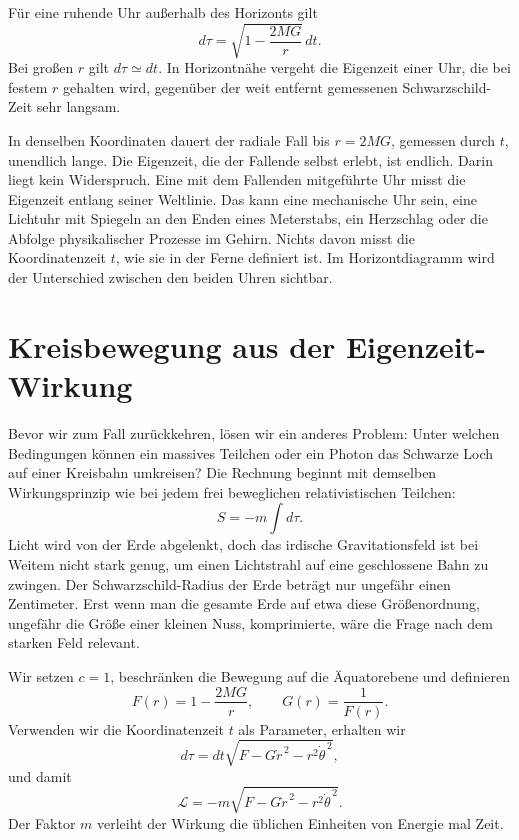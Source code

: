 Für eine ruhende Uhr außerhalb des Horizonts gilt
\begin{equation}
d\tau
=
\sqrt{1-\frac{2MG}{r}}\,dt.
\label{eq:l6-static-clock}
\end{equation}
Bei großen \(r\) gilt \(d\tau\simeq dt\). In Horizontnähe vergeht die Eigenzeit einer Uhr, die bei festem \(r\) gehalten wird, gegenüber der weit entfernt gemessenen Schwarzschild-Zeit sehr langsam.

In denselben Koordinaten dauert der radiale Fall bis \(r=2MG\), gemessen durch \(t\), unendlich lange. Die Eigenzeit, die der Fallende selbst erlebt, ist endlich. Darin liegt kein Widerspruch. Eine mit dem Fallenden mitgeführte Uhr misst die Eigenzeit entlang seiner Weltlinie. Das kann eine mechanische Uhr sein, eine Lichtuhr mit Spiegeln an den Enden eines Meterstabs, ein Herzschlag oder die Abfolge physikalischer Prozesse im Gehirn. Nichts davon misst die Koordinatenzeit \(t\), wie sie in der Ferne definiert ist. Im Horizontdiagramm wird der Unterschied zwischen den beiden Uhren sichtbar.

\section{Kreisbewegung aus der Eigenzeit-Wirkung}

Bevor wir zum Fall zurückkehren, lösen wir ein anderes Problem: Unter welchen Bedingungen können ein massives Teilchen oder ein Photon das Schwarze Loch auf einer Kreisbahn umkreisen? Die Rechnung beginnt mit demselben Wirkungsprinzip wie bei jedem frei beweglichen relativistischen Teilchen:
\begin{equation}
S=-m\int d\tau.
\label{eq:l6-particle-action}
\end{equation}
Licht wird von der Erde abgelenkt, doch das irdische Gravitationsfeld ist bei Weitem nicht stark genug, um einen Lichtstrahl auf eine geschlossene Bahn zu zwingen. Der Schwarzschild-Radius der Erde beträgt nur ungefähr einen Zentimeter. Erst wenn man die gesamte Erde auf etwa diese Größenordnung, ungefähr die Größe einer kleinen Nuss, komprimierte, wäre die Frage nach dem starken Feld relevant.

Wir setzen \(c=1\), beschränken die Bewegung auf die Äquatorebene und definieren
\begin{equation}
F(r)=1-\frac{2MG}{r},
\qquad
G(r)=\frac{1}{F(r)}.
\label{eq:l6-fg}
\end{equation}
Verwenden wir die Koordinatenzeit \(t\) als Parameter, erhalten wir
\begin{equation}
d\tau
=dt\sqrt{F-G\dot r^{\,2}-r^{2}\dot\theta^{\,2}},
\end{equation}
und damit
\begin{equation}
\mathcal L
=
-m\sqrt{F-G\dot r^{\,2}-r^{2}\dot\theta^{\,2}}.
\label{eq:l6-lagrangian}
\end{equation}
Der Faktor \(m\) verleiht der Wirkung die üblichen Einheiten von Energie mal Zeit.

